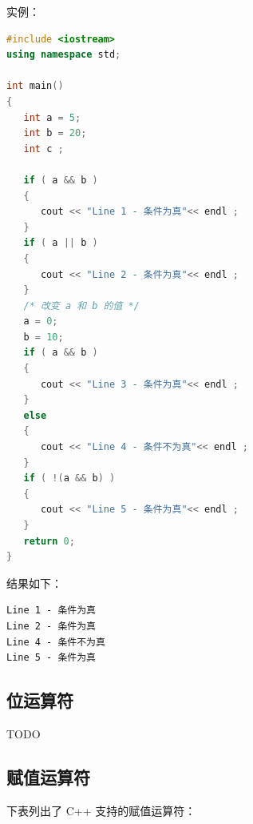 \documentclass[
  paper=a4,
  ,captions=tableheading
]{scrbook}
\begin{document}
实例：

\begin{lstlisting}[language={C++}]
#include <iostream>
using namespace std;

int main()
{
   int a = 5;
   int b = 20;
   int c ;

   if ( a && b )
   {
      cout << "Line 1 - 条件为真"<< endl ;
   }
   if ( a || b )
   {
      cout << "Line 2 - 条件为真"<< endl ;
   }
   /* 改变 a 和 b 的值 */
   a = 0;
   b = 10;
   if ( a && b )
   {
      cout << "Line 3 - 条件为真"<< endl ;
   }
   else
   {
      cout << "Line 4 - 条件不为真"<< endl ;
   }
   if ( !(a && b) )
   {
      cout << "Line 5 - 条件为真"<< endl ;
   }
   return 0;
}
\end{lstlisting}

结果如下：

\begin{lstlisting}
Line 1 - 条件为真
Line 2 - 条件为真
Line 4 - 条件不为真
Line 5 - 条件为真
\end{lstlisting}

\hypertarget{ux4f4dux8fd0ux7b97ux7b26}{%
\subsection{位运算符}\label{ux4f4dux8fd0ux7b97ux7b26}}

TODO

\hypertarget{ux8d4bux503cux8fd0ux7b97ux7b26}{%
\subsection{赋值运算符}\label{ux8d4bux503cux8fd0ux7b97ux7b26}}

下表列出了 C++ 支持的赋值运算符：
\end{document}
